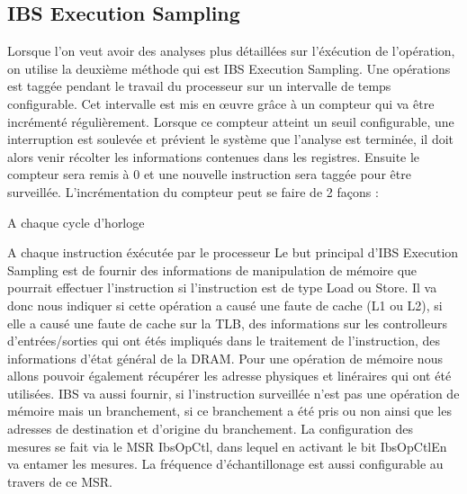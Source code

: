 			\subsection{IBS Execution Sampling}
			Lorsque l'on veut avoir des analyses plus détaillées sur l'éxécution de l'opération, on utilise la deuxième méthode qui est IBS Execution Sampling. Une opérations est taggée pendant le travail du processeur sur un intervalle de temps configurable. Cet intervalle est mis en \oe uvre grâce à un compteur qui va être incrémenté régulièrement. Lorsque ce compteur atteint un seuil configurable, une interruption est soulevée et prévient le système que l'analyse est terminée, il doit alors venir récolter les informations contenues dans les registres. Ensuite le compteur sera remis à 0 et une nouvelle instruction sera taggée pour être surveillée. L'incrémentation du compteur peut se faire de 2 façons : 
			\bitem
				\item{A chaque cycle d'horloge}
				\item{A chaque instruction éxécutée par le processeur}
			\eitem
			Le but principal d'IBS Execution Sampling est de fournir des informations de manipulation de mémoire que pourrait effectuer l'instruction si l'instruction est de type Load ou Store. Il va donc nous indiquer si cette opération a causé une faute de cache (L1 ou L2), si elle a causé une faute de cache sur la TLB, des informations sur les controlleurs d'entrées/sorties qui ont étés impliqués dans le traitement de l'instruction, des informations d'état général de la DRAM. Pour une opération de mémoire nous allons pouvoir également récupérer les adresse physiques et linéraires qui ont été utilisées. IBS va aussi fournir, si l'instruction surveillée n'est pas une opération de mémoire mais un branchement, si ce branchement a été pris ou non ainsi que les adresses de destination et d'origine du branchement. La configuration des mesures se fait via le MSR IbsOpCtl, dans lequel en activant le bit IbsOpCtlEn va entamer les mesures. La fréquence d'échantillonage est aussi configurable au travers de ce MSR. 
